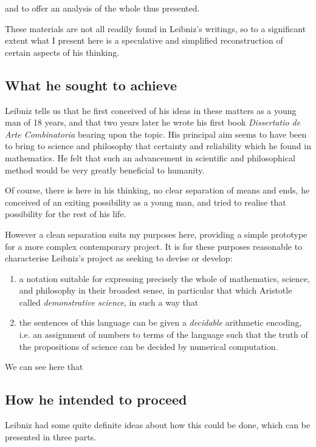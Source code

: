 and to offer an analysis of the whole thus presented.

These materials are not all readily found in Leibniz's writings, so to a significant
extent what I present here is a speculative and simplified reconstruction of certain
aspects of his thinking.

\subsection{What he sought to achieve}

Leibniz tells us that he first conceived of his ideas in these matters as a young man
of 18 years, and that two years later he wrote his first book \emph{Dissertatio de Arte Combinatoria}\cite{leibniz66}
bearing upon the topic.
His principal aim seems to have been to bring to science and philosophy that certainty and
reliability which he found in mathematics.
He felt that such an advancement in scientific and philosophical method would be very greatly
beneficial to humanity.

Of course, there is here in his thinking, no clear separation of means and ends,
he conceived of an exiting possibility as a young man, and tried to realise that
possibility for the rest of his life.

However a clean separation suits my purposes here, providing a simple prototype
for a more complex contemporary project.
It is for these purposes reasonable to characterise Leibniz's project as seeking
to devise or develop:

\begin{enumerate}
\item a notation suitable for expressing precisely the whole of mathematics, science,
and philosophy in their broadest sense, in particular that which Aristotle called
\emph{demonstrative science}, in such a way that
\item the sentences of this language can be given a \emph{decidable} arithmetic encoding,
i.e. an assignment of numbers to terms of the language such that the truth of the
propositions of science can be decided by numerical computation.
\end{enumerate}

We can see here that 

\subsection{How he intended to proceed}

Leibniz had some quite definite ideas about how this could be done, which can be presented
in three parts.


